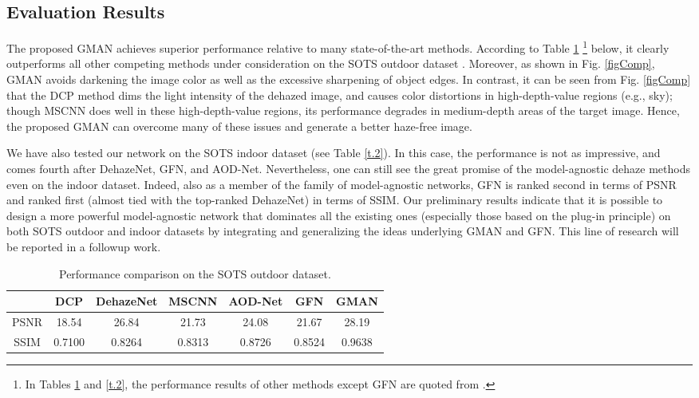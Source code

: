 \documentclass[journal]{IEEEtran}
\begin{document}
\subsection{Evaluation Results}

The proposed GMAN achieves superior performance relative to many state-of-the-art methods. According to Table \ref{t.1} \footnote{In Tables \ref{t.1} and \ref{t.2}, the performance results of other methods except GFN are quoted from \cite{li2017reside}.} below, it clearly outperforms all other competing methods under consideration on the SOTS outdoor dataset \cite{DarkChanPrior,DehazeNet,MultiScaleCNN,AllInOne}.  Moreover, as shown in Fig. \ref{figComp}, GMAN avoids darkening the image color  as well as the excessive sharpening of object edges. In contrast, it can be seen from Fig. \ref{figComp} that the DCP  method \cite{DarkChanPrior} dims the light intensity of the dehazed image, and causes color distortions in high-depth-value regions (e.g., sky); though MSCNN \cite{MultiScaleCNN} does well in these high-depth-value regions, its performance degrades in medium-depth areas of the target image. Hence, the proposed GMAN can overcome many of these issues and generate a better haze-free image.


We have also tested our network on the SOTS indoor dataset (see Table \ref{t.2}). In this case, the performance is not as impressive, and comes fourth after DehazeNet, GFN, and AOD-Net. Nevertheless, one can still see the great promise of the model-agnostic dehaze methods even on the indoor dataset. Indeed, also as a member of the family of model-agnostic networks, GFN is ranked second in terms of PSNR and ranked first (almost tied with the top-ranked DehazeNet) in terms of SSIM. Our preliminary results indicate that it is possible to design a more powerful model-agnostic network  that dominates all the existing ones (especially those based on the plug-in principle) on both SOTS outdoor and indoor datasets by integrating and generalizing the ideas underlying GMAN and GFN. This line of research will be reported in a followup work.

\begin{table}[!htbp]
	\centering
	\caption{Performance comparison on the SOTS outdoor dataset.}
	\begin{tabular}{ccccccc}
		\hline
		&DCP &DehazeNet &MSCNN &AOD-Net &GFN &GMAN\\ \hline
		PSNR &18.54 &26.84 &21.73 &24.08 &21.67 &28.19\\
		SSIM &0.7100 &0.8264 &0.8313 &0.8726 &0.8524 &0.9638\\ \hline
	\end{tabular}
	\label{t.1}
\end{table}
\end{document}
